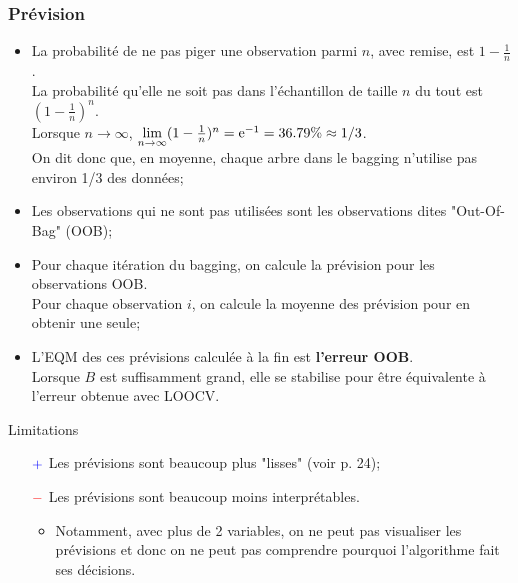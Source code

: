 \documentclass[10pt, french]{article}
\begin{document}
\begin{multicols*}{3}
\subsubsection*{Prévision}
\begin{itemize}[leftmargin = *]
	\item	La probabilité de ne pas piger une observation parmi $n$, avec remise, est $1 - \frac{1}{n}$.\\
			La probabilité qu'elle ne soit pas dans l'échantillon de taille $n$ du tout est $(1 - \frac{1}{n})^{n}$.\\
			Lorsque $n \rightarrow \infty$, $\underset{n \rightarrow \infty}{\lim}(1 - \frac{1}{n})^{n} = \textrm{e}^{-1} = 36.79\% \approx 1/3$.\\
			On dit donc que, en moyenne, chaque arbre dans le bagging n'utilise pas environ 1/3 des données;
	\item	Les observations qui ne sont pas utilisées sont les observations dites "Out-Of-Bag" (OOB);
	\item	Pour chaque itération du bagging, on calcule la prévision pour les observations OOB.\\
			Pour chaque observation $i$, on calcule la moyenne des prévision pour en obtenir une seule;
	\item	L'EQM des ces prévisions calculée à la fin est \textbf{l'erreur OOB}.\\
			Lorsque $B$ est suffisamment grand, elle se stabilise pour être équivalente à l'erreur obtenue avec LOOCV.
\end{itemize}

Limitations
\begin{itemize}
	\item[$\color{blue}+$]	Les prévisions sont beaucoup plus "lisses" (voir p. 24);
	\item[$\color{red}-$]	Les prévisions sont beaucoup moins interprétables.
		\begin{itemize}[leftmargin = *]
		\item	Notamment, avec plus de 2 variables, on ne peut pas visualiser les prévisions et donc on ne peut pas comprendre pourquoi l'algorithme fait ses décisions.
		\end{itemize}
\end{itemize}


\end{multicols*}
\end{document}
